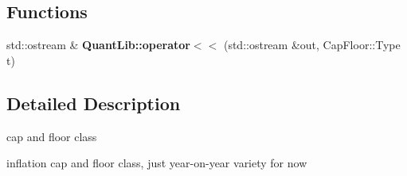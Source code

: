 \subsection*{Functions}
\begin{DoxyCompactItemize}
\item 
std\+::ostream \& {\bfseries Quant\+Lib\+::operator$<$$<$} (std\+::ostream \&out, Cap\+Floor\+::\+Type t)\label{capfloor_8cpp_ad7ad615d8427817961312eb987c2a91c}

\end{DoxyCompactItemize}


\subsection{Detailed Description}
cap and floor class 

inflation cap and floor class, just year-\/on-\/year variety for now